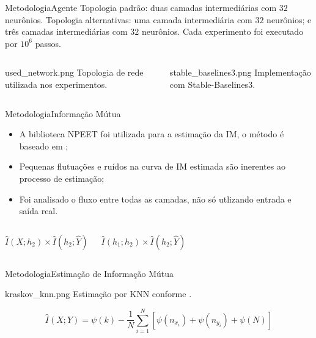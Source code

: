 \documentclass[
11pt,notheorems,hyperref={pdfauthor=Autor}
]{beamer}
\begin{document}
\begin{frame}{Metodologia}{Agente}
\pause
Topologia padrão: duas camadas intermediárias com $32$ neurônios.\newline\pause
Topologia alternativas: uma camada intermediária com $32$ neurônios; e três camadas intermediárias com $32$ neurônios.\newline\pause
Cada experimento foi executado por $10^6$ passos. \newline\pause
\begin{columns}[T]
    \FigureWithFallbackCaption
    {used_network.png}
    {Topologia de rede utilizada nos experimentos.}
    \pause

    \FigureWithFallbackCaption
    {stable_baselines3.png}
    {Implementação com Stable-Baselines3.}
\end{columns}
\end{frame}

\begin{frame}{Metodologia}{Informação Mútua}
    
    \begin{itemize}
        \item A biblioteca NPEET foi utilizada para a estimação da IM, o método é baseado em \textcite{kraskov_estimating_2004}; \pause
        \item Pequenas flutuações e ruídos na curva de IM estimada são inerentes ao processo de estimação; \pause
        \item Foi analisado o fluxo entre todas as camadas, não só utlizando entrada e saída real. \pause
    \end{itemize}


\begin{columns}[T]
    \LARGE{\begin{equation*}
        \hat{I}(X;h_2) \times \hat I (h_2; \hat Y)
    \end{equation*}}

    \LARGE{\begin{equation*}
        \hat{I}(h_1;h_2) \times \hat I (h_2; \hat Y)
    \end{equation*}}
\end{columns}
\end{frame}

\begin{frame}{Metodologia}{Estimação de Informação Mútua}
    \pause
    \centering
    \begin{minipage}{0.4\textwidth}
        \FigureWithFallbackCaption
        {kraskov_knn.png}
        {Estimação por KNN conforme \textcite{kraskov_estimating_2004}.}
    \end{minipage}
    \pause
    \Large{\begin{equation*}
        {\hat{I}(X;Y) = \psi(k)-\frac{1}{N}\sum_{i=1}^{N}\left[\psi(n_{x_i}) + \psi(n_{y_i}) + \psi(N)\right]}
    \end{equation*}}
\end{frame}
\end{document}
